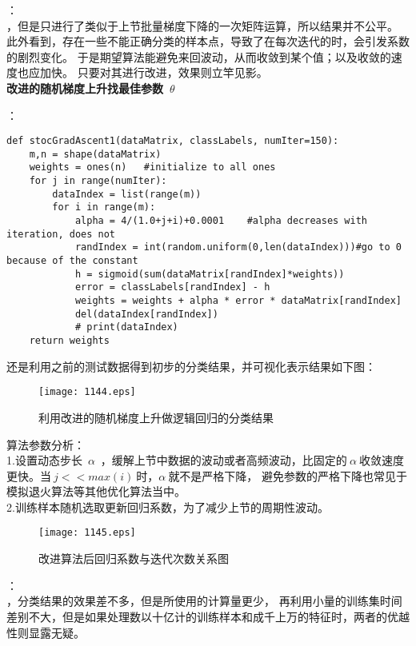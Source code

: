 ：\\
，但是只进行了类似于上节批量梯度下降的一次矩阵运算，所以结果并不公平。\\
此外看到，存在一些不能正确分类的样本点，导致了在每次迭代的时，会引发系数的剧烈变化。
于是期望算法能避免来回波动，从而收敛到某个值；以及收敛的速度也应加快。
只要对其进行改进，效果则立竿见影。\\


\noindent\textbf{改进的随机梯度上升找最佳参数~$\theta$~}\par
{}：
\begin{lstlisting}
def stocGradAscent1(dataMatrix, classLabels, numIter=150):
    m,n = shape(dataMatrix)
    weights = ones(n)   #initialize to all ones
    for j in range(numIter):
        dataIndex = list(range(m))
        for i in range(m):
            alpha = 4/(1.0+j+i)+0.0001    #alpha decreases with iteration, does not
            randIndex = int(random.uniform(0,len(dataIndex)))#go to 0 because of the constant
            h = sigmoid(sum(dataMatrix[randIndex]*weights))
            error = classLabels[randIndex] - h
            weights = weights + alpha * error * dataMatrix[randIndex]
            del(dataIndex[randIndex])
            # print(dataIndex)
    return weights
\end{lstlisting}


还是利用之前的测试数据得到初步的分类结果，并可视化表示结果如下图：
\begin{figure}[!htb]
  \centering
  \texttt{[image: 1144.eps]}
  \caption{利用改进的随机梯度上升做逻辑回归的分类结果}
\end{figure}


\noindent 算法参数分析：\\
\indent1.设置动态步长~$\alpha$~，缓解上节中数据的波动或者高频波动，比固定的$~\alpha~$收敛速度更快。当$~j<<max(i)~$时，$\alpha~$就不是严格下降，
避免参数的严格下降也常见于模拟退火算法等其他优化算法当中。\\
\indent2.训练样本随机选取更新回归系数，为了减少上节的周期性波动。

\begin{figure}[!htb]
  \centering
  \texttt{[image: 1145.eps]}
  \caption{改进算法后回归系数与迭代次数关系图}
\end{figure}

：\\
，分类结果的效果差不多，但是所使用的计算量更少，
再利用小量的训练集时间差别不大，但是如果处理数以十亿计的训练样本和成千上万的特征时，两者的优越性则显露无疑。

